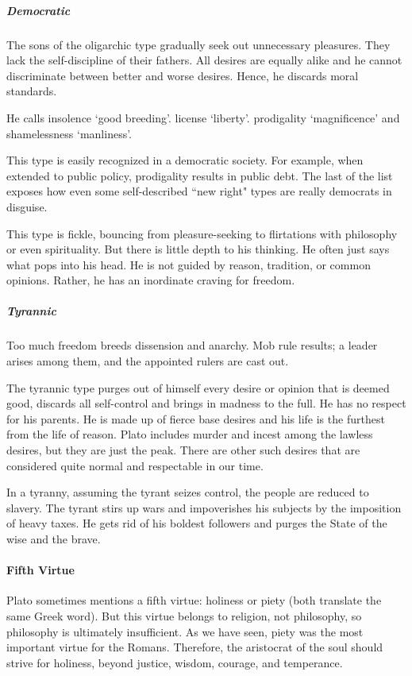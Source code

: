 \subparagraph{Democratic}
The sons of the oligarchic type gradually seek out unnecessary pleasures. They lack the self-discipline of their fathers. All desires are equally alike and he cannot discriminate between better and worse desires. Hence, he discards moral standards.

\begin{quotex}
He calls insolence `good breeding'. license `liberty'. prodigality `magnificence' and shamelessness `manliness’. 

\end{quotex}
This type is easily recognized in a democratic society. For example, when extended to public policy, prodigality results in public debt. The last of the list exposes how even some self-described ``new right" types are really democrats in disguise.

This type is fickle, bouncing from pleasure-seeking to flirtations with philosophy or even spirituality. But there is little depth to his thinking. He often just says what pops into his head. He is not guided by reason, tradition, or common opinions. Rather, he has an inordinate craving for freedom.

\subparagraph{Tyrannic}
Too much freedom breeds dissension and anarchy. Mob rule results; a leader arises among them, and the appointed rulers are cast out.

The tyrannic type purges out of himself every desire or opinion that is deemed good, discards all self-control and brings in madness to the full. He has no respect for his parents. He is made up of fierce base desires and his life is the furthest from the life of reason. Plato includes murder and incest among the lawless desires, but they are just the peak. There are other such desires that are considered quite normal and respectable in our time.

In a tyranny, assuming the tyrant seizes control, the people are reduced to slavery. The tyrant stirs up wars and impoverishes his subjects by the imposition of heavy taxes. He gets rid of his boldest followers and purges the State of the wise and the brave.

\paragraph{Fifth Virtue}
Plato sometimes mentions a fifth virtue: holiness or piety (both translate the same Greek word). But this virtue belongs to religion, not philosophy, so philosophy is ultimately insufficient. As we have seen, piety was the most important virtue for the Romans. Therefore, the aristocrat of the soul should strive for holiness, beyond justice, wisdom, courage, and temperance.



